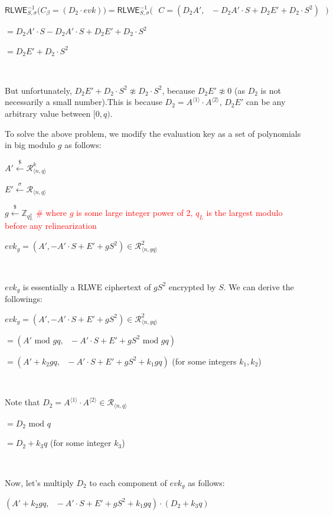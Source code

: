 $\textsf{RLWE}_{S, \sigma}^{-1}\bm{(}C_\beta = (D_2 \cdot \mathit{evk})\bm{)} = \textsf{RLWE}_{S, \sigma}^{-1}\bm{(} \text{ } C = (D_2A', \text{ } -D_2A'\cdot S + D_2E' + D_2\cdot S^2) \text{ } \bm{)}$

$= D_2A'\cdot S - D_2A'\cdot S + D_2E' + D_2\cdot S^2$

$= D_2E' + D_2\cdot S^2$

$ $

But unfortunately, $D_2E' + D_2\cdot S^2 \not\approx D_2\cdot S^2$, because $D_2E' \not\approx 0$ (as $D_2$ is not necessarily a small number).This is because $D_2 = A^{\langle 1 \rangle} \cdot A^{\langle 2 \rangle}$, $D_2E'$ can be any arbitrary value between $[0, q)$. 


To solve the above problem, we modify the evaluation key as a set of polynomials in big modulo $g$ as follows:


$A'  \xleftarrow{\$} \mathcal{R}_{\langle n,q\rangle }^{k}$

$E' \xleftarrow{\sigma} \mathcal{R}_{\langle n,q\rangle }$

$g \xleftarrow{\$} \mathbb{Z}_{q_L^2}$ \textcolor{red}{\text{ } \# where $g$ is some large integer power of 2, $q_L$ is the largest modulo before any relinearization}

$\mathit{evk_g} = (A', -A'\cdot S + E' + g S^2) \in \mathcal{R}_{\langle n, gq\rangle}^2$

$ $

$\mathit{evk_g}$ is essentially a RLWE ciphertext of $g S^2$ encrypted by $S$. We can derive the followings:

$\mathit{evk_g} = (A', -A'\cdot S + E' + g S^2) \in \mathcal{R}_{\langle n, gq\rangle}^2$

$= (A'  \text{ mod } gq, \text{ } -A'\cdot S + E' + g S^2 \text{ mod } gq)$

$= (A' + k_2gq, \text{ } -A'\cdot S + E' + g S^2 + k_1gq)$  \text{ } (for some integers $k_1, k_2$)

$ $

Note that $D_2 = A^{\langle 1 \rangle} \cdot A^{\langle 2 \rangle} \in \mathcal{R}_{\langle n, q \rangle}$

$= D_2 \text{ mod } q$

$= D_2 + k_3q$ \text{ } (for some integer $k_3$)

$ $

Now, let's multiply $D_2$ to each component of $\mathit{evk_g}$ as follows: 

$(A' + k_2gq, \text{ } -A'\cdot S + E' + g S^2 + k_1gq) \cdot (D_2 + k_3q)$

